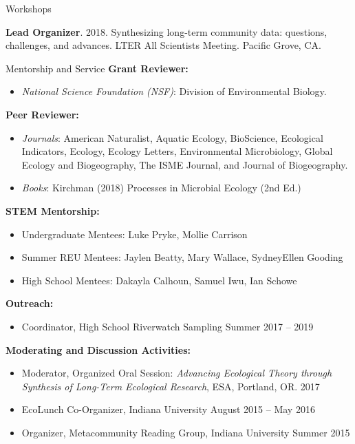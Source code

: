 \documentclass{resume} %
\begin{document}
\bigskip


\newpage
\begin{rSection}{Workshops}

{\bf Lead Organizer}. 2018. Synthesizing long-term community data: questions, challenges, and advances. LTER All Scientists Meeting. Pacific Grove, CA.

\end{rSection}
\bigskip

\begin{rSection}{Mentorship and Service}
{\bf Grant Reviewer:}
\begin{itemize}
  \item {\em National Science Foundation (NSF)}: Division of Environmental Biology.
\end{itemize}

{\bf Peer Reviewer:}
\begin{itemize}
  \item {\em Journals}: American Naturalist, Aquatic Ecology, BioScience, Ecological Indicators, Ecology, Ecology Letters, Environmental Microbiology, Global Ecology and Biogeography, The ISME Journal, and Journal of Biogeography.
  \item {\em Books}: Kirchman (2018) Processes in Microbial Ecology (2nd Ed.)
\end{itemize}

{\bf STEM Mentorship:}
\begin{itemize}
  \item Undergraduate Mentees: Luke Pryke, Mollie Carrison
  \item Summer REU Mentees: Jaylen Beatty, Mary Wallace, SydneyEllen Gooding
  \item High School Mentees: Dakayla Calhoun, Samuel Iwu, Ian Schowe
\end{itemize}

{\bf Outreach:}
\begin{itemize}
  \item {Coordinator, High School Riverwatch Sampling} \hfill Summer 2017 -- 2019
\end{itemize}

{\bf Moderating and Discussion Activities:}
\begin{itemize}
  \item Moderator, Organized Oral Session: {\em Advancing Ecological Theory through Synthesis of Long-Term Ecological Research}, ESA, Portland, OR. \hfill 2017
  \item EcoLunch Co-Organizer, Indiana University \hfill August 2015 -- May 2016
  \item Organizer, Metacommunity Reading Group, Indiana University \hfill Summer 2015
\end{itemize}


\end{rSection}
\end{document}

